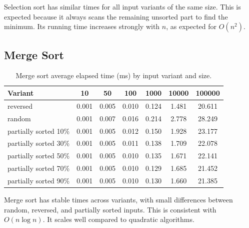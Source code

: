 \documentclass[11pt,a4paper]{article}
\begin{document}
Selection sort has similar times for all input variants of the same size. This is expected because it always scans the remaining unsorted part to find the minimum. Its running time increases strongly with \(n\), as expected for \(O(n^2)\).

\subsection{Merge Sort}
\begin{table}[H]
\centering
\begin{tabular}{lcccccc}
\toprule
Variant & 10 & 50 & 100 & 1000 & 10000 & 100000 \\
\midrule
reversed & 0.001 & 0.005 & 0.010 & 0.124 & 1.481 & 20.611 \\
random & 0.001 & 0.007 & 0.016 & 0.214 & 2.778 & 28.249 \\
partially sorted 10\% & 0.001 & 0.005 & 0.012 & 0.150 & 1.928 & 23.177 \\
partially sorted 30\% & 0.001 & 0.005 & 0.011 & 0.138 & 1.709 & 22.078 \\
partially sorted 50\% & 0.001 & 0.005 & 0.010 & 0.135 & 1.671 & 22.141 \\
partially sorted 70\% & 0.001 & 0.005 & 0.010 & 0.129 & 1.685 & 21.452 \\
partially sorted 90\% & 0.001 & 0.005 & 0.010 & 0.130 & 1.660 & 21.385 \\
\bottomrule
\end{tabular}
\caption{Merge sort average elapsed time (ms) by input variant and size.}
\label{tab:merge-results}
\end{table}

Merge sort has stable times across variants, with small differences between random, reversed, and partially sorted inputs. This is consistent with \(O(n\log n)\). It scales well compared to quadratic algorithms.
\end{document}
